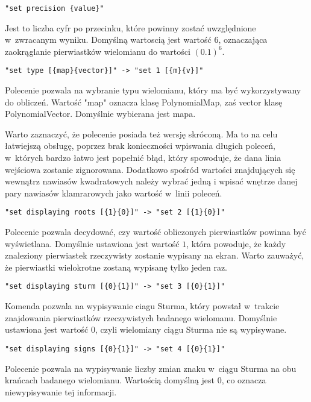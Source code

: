 \begin{lstlisting}
"set precision {value}"
\end{lstlisting}

Jest to liczba cyfr po przecinku, które powinny zostać uwzględnione w~zwracanym wyniku. Domyślną wartoscią jest wartość $6$, oznaczająca zaokrąglanie pierwiastków wielomianu do wartości $(0.1)^6$.

\begin{lstlisting}
"set type [{map}{vector}]" -> "set 1 [{m}{v}]"
\end{lstlisting}

Polecenie pozwala na wybranie typu wielomianu, który ma być wykorzystywany do obliczeń. Wartość "map" oznacza klasę PolynomialMap, zaś vector klasę PolynomialVector. Domyślnie wybierana jest mapa.

Warto zaznaczyć, że polecenie posiada też wersję skróconą. Ma to na celu łatwiejszą obsługę, poprzez brak konieczności wpiswania długich poleceń, w~których bardzo łatwo jest popełnić błąd, który spowoduje, że dana linia wejściowa zostanie zignorowana. Dodatkowo spośród wartości znajdujących się wewnątrz nawiasów kwadratowych należy wybrać jedną i wpisać wnętrze danej pary nawiasów klamrarowych jako wartość w~linii poleceń.

\begin{lstlisting}
"set displaying roots [{1}{0}]" -> "set 2 [{1}{0}]"
\end{lstlisting}
Polecenie pozwala decydować, czy wartość obliczonych pierwiastków powinna być wyświetlana. Domyślnie ustawiona jest wartość $1$, która powoduje, że każdy znaleziony pierwiastek rzeczywisty zostanie wypisany na ekran. Warto zauważyć, że pierwiastki wielokrotne zostaną wypisanę tylko jeden raz.

\begin{lstlisting}
"set displaying sturm [{0}{1}]" -> "set 3 [{0}{1}]"
\end{lstlisting}

Komenda pozwala na wypisywanie ciagu Sturma, który powstał w~trakcie znajdowania pierwiastków rzeczywistych badanego wielomanu. Domyślnie ustawiona jest wartość $0$, czyli wielomiany ciągu Sturma nie są wypisywane.

\begin{lstlisting}
"set displaying signs [{0}{1}]" -> "set 4 [{0}{1}]"
\end{lstlisting}

Polecenie pozwala na wypisywanie liczby zmian znaku w~ciągu Sturma na obu krańcach badanego wielomianu. Wartością domyślną jest $0$, co oznacza niewypisywanie tej informacji.


